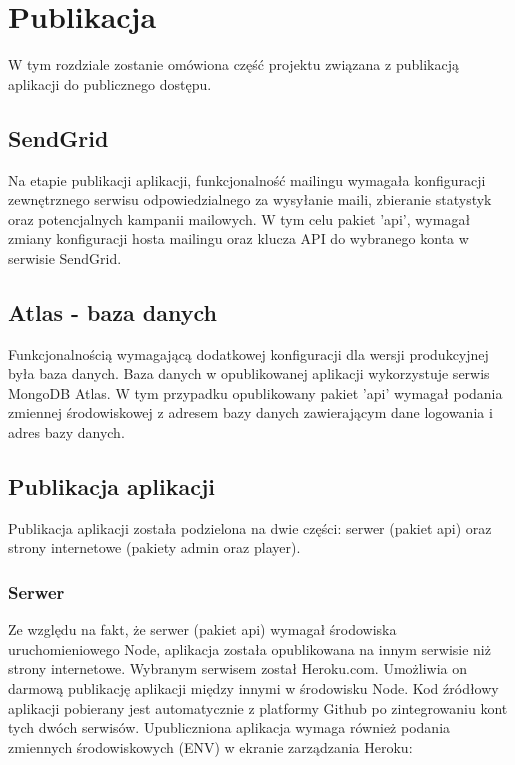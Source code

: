 \chapter{Publikacja}
\label{ch:publikacja}

W tym rozdziale zostanie omówiona część projektu związana z publikacją aplikacji do publicznego dostępu.

\label{publication:sendgrid}
\section{SendGrid}
Na etapie publikacji aplikacji, funkcjonalność mailingu wymagała konfiguracji zewnętrznego serwisu odpowiedzialnego za wysyłanie maili, zbieranie statystyk oraz potencjalnych kampanii mailowych. W tym celu pakiet 'api', wymagał zmiany konfiguracji hosta mailingu oraz klucza API do wybranego konta w serwisie SendGrid.

\section{Atlas - baza danych}
Funkcjonalnością wymagającą dodatkowej konfiguracji dla wersji produkcyjnej była baza danych. Baza danych w opublikowanej aplikacji wykorzystuje serwis MongoDB Atlas. W tym przypadku opublikowany pakiet 'api' wymagał podania zmiennej środowiskowej z adresem bazy danych zawierającym dane logowania i adres bazy danych.

\section{Publikacja aplikacji}
Publikacja aplikacji została podzielona na dwie części: serwer (pakiet api) oraz strony internetowe (pakiety admin oraz player).

\subsection{Serwer}
Ze względu na fakt, że serwer (pakiet api) wymagał środowiska uruchomieniowego Node, aplikacja została opublikowana na innym serwisie niż strony internetowe. Wybranym serwisem został Heroku.com. Umożliwia on darmową publikację aplikacji między innymi w środowisku Node. Kod źródłowy aplikacji pobierany jest automatycznie z platformy Github po zintegrowaniu kont tych dwóch serwisów. Upubliczniona aplikacja wymaga również podania zmiennych środowiskowych (ENV) w ekranie zarządzania Heroku:

